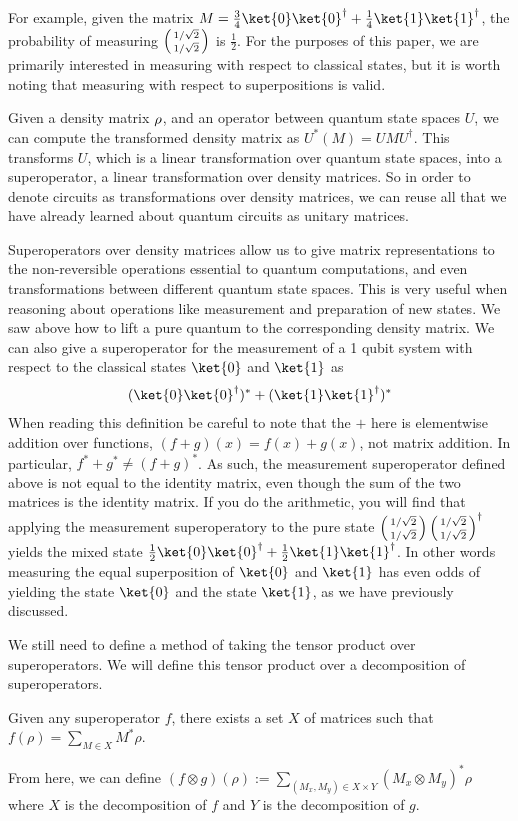For example, given the matrix $M = \frac{3}{4}\ket{0}\ket{0}^\dagger + \frac{1}{4}\ket{1}\ket{1}^\dagger$, the probability of measuring $\left(\begin{smallmatrix}1 / \sqrt{2} \\ 1 / \sqrt{2}\end{smallmatrix}\right)$ is $\frac{1}{2}$.
For the purposes of this paper, we are primarily interested in measuring with respect to classical states, but it is worth noting that measuring with respect to superpositions is valid.

Given a density matrix $\rho$, and an operator between quantum state spaces $U$, we can compute the transformed density matrix as $U^*(M)=UMU^\dagger$.
This transforms $U$, which is a linear transformation over quantum state spaces, into a superoperator, a linear transformation over density matrices.
So in order to denote circuits as transformations over density matrices, we can reuse all that we have already learned about quantum circuits as unitary matrices.


Superoperators over density matrices allow us to give matrix representations to the non-reversible operations essential to quantum computations, and even transformations between different quantum state spaces.
This is very useful when reasoning about operations like measurement and preparation of new states.
We saw above how to lift a pure quantum to the corresponding density matrix.
We can also give a superoperator for the measurement of a 1 qubit system with respect to the classical states $\ket{0}$ and $\ket{1}$ as
\begin{align*}
    (\ket{0}\ket{0}^\dagger )^* + (\ket{1}\ket{1}^\dagger )^*
\end{align*}
When reading this definition be careful to note that the $+$ here is elementwise addition over functions, $(f + g)(x) = f(x) + g(x)$, not matrix addition.
In particular, $f^* + g^* \neq (f+g)^*$.
As such, the measurement superoperator defined above is not equal to the identity matrix, even though the sum of the two matrices is the identity matrix.
If you do the arithmetic, you will find that applying the measurement superoperatory to the pure state $\left(\begin{smallmatrix}1/\sqrt{2} \\ 1/\sqrt{2}\end{smallmatrix}\right)\left(\begin{smallmatrix}1/\sqrt{2} \\ 1/\sqrt{2}\end{smallmatrix}\right)^\dagger$ yields the mixed state $\frac{1}{2}\ket{0}\ket{0}^\dagger + \frac{1}{2}\ket{1}\ket{1}^\dagger$.
In other words measuring the equal superposition of $\ket{0}$ and $\ket{1}$ has even odds of yielding the state $\ket{0}$ and the state $\ket{1}$, as we have previously discussed.

We still need to define a method of taking the tensor product over superoperators.
We will define this tensor product over a decomposition of superoperators.
\begin{lemma}
    Given any superoperator $f$, there exists a set $X$ of matrices such that $f(\rho)=\sum_{M\in X}M^*\rho$.
\end{lemma}
From here, we can define $(f \otimes g) (\rho) := \sum_{(M_x, M_y) \in X \times Y}(M_x \otimes M_y)^*\rho$ where $X$ is the decomposition of $f$ and $Y$ is the decomposition of $g$.

